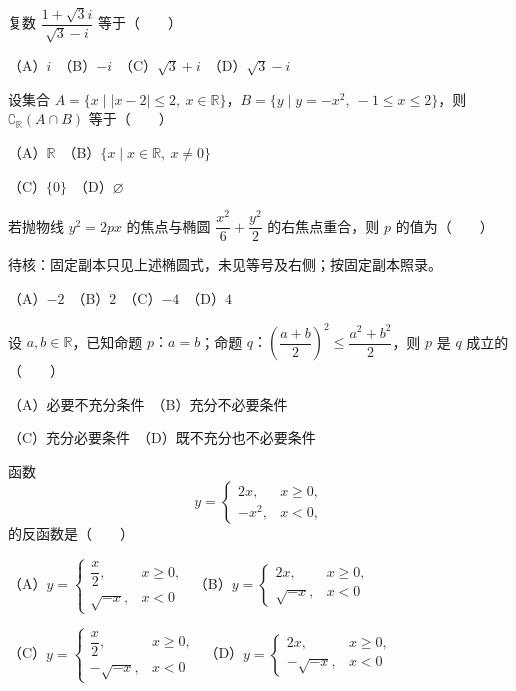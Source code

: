 \begin{question}
复数 $\dfrac{1+\sqrt{3}i}{\sqrt{3}-i}$ 等于\mbox{（　　）}

（A）$i$　（B）$-i$　（C）$\sqrt{3}+i$　（D）$\sqrt{3}-i$

\end{question}
\begin{question}
设集合 $A=\{x\mid |x-2|\leqslant 2,\ x\in\mathbb R\}$，$B=\{y\mid y=-x^2,\ -1\leqslant x\leqslant 2\}$，则 $\complement_{\mathbb R}(A\cap B)$ 等于\mbox{（　　）}

（A）$\mathbb R$　（B）$\{x\mid x\in\mathbb R,\ x\ne0\}$

（C）$\{0\}$　（D）$\varnothing$

\end{question}
\begin{question}
若抛物线 $y^2=2px$ 的焦点与椭圆 $\dfrac{x^2}{6}+\dfrac{y^2}{2}$ 的右焦点重合，则 $p$ 的值为\mbox{（　　）}

\begin{gktip}
待核：固定副本只见上述椭圆式，未见等号及右侧；按固定副本照录。
\end{gktip}

（A）$-2$　（B）$2$　（C）$-4$　（D）$4$

\end{question}
\begin{question}
设 $a,b\in\mathbb R$，已知命题 $p\text{：}a=b$；命题 $q\text{：}\left(\dfrac{a+b}{2}\right)^2\leqslant\dfrac{a^2+b^2}{2}$，则 $p$ 是 $q$ 成立的\mbox{（　　）}

（A）必要不充分条件　（B）充分不必要条件

（C）充分必要条件　（D）既不充分也不必要条件

\end{question}
\begin{question}
函数
\nopagebreak[4]
\[
y=\begin{cases}
2x,&x\geqslant0,\\
-x^2,&x<0,
\end{cases}
\]
的反函数是\mbox{（　　）}

（A）$y=\begin{cases}\dfrac{x}{2},&x\geqslant0,\\\sqrt{-x},&x<0\end{cases}$　（B）$y=\begin{cases}2x,&x\geqslant0,\\\sqrt{-x},&x<0\end{cases}$

（C）$y=\begin{cases}\dfrac{x}{2},&x\geqslant0,\\-\sqrt{-x},&x<0\end{cases}$　（D）$y=\begin{cases}2x,&x\geqslant0,\\-\sqrt{-x},&x<0\end{cases}$

\Needspace{0.4\textheight}
\end{question}
